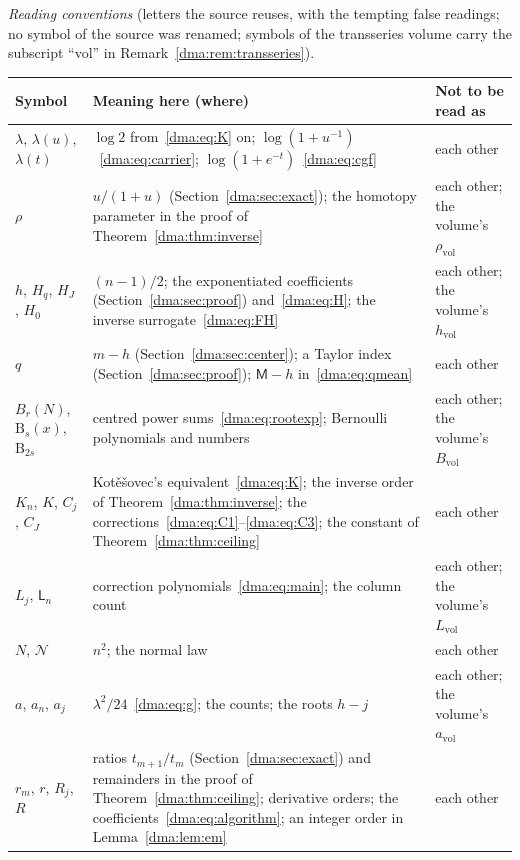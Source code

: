 \documentclass[11pt,letterpaper]{article}
\theoremstyle{remark}\newtheorem{remark}[theorem]{Remark}
\begin{document}
\medskip\noindent\begin{minipage}{\textwidth}
\emph{Reading conventions} (letters the source reuses, with the tempting
false readings; no symbol of the source was renamed; symbols of the
transseries volume carry the subscript ``vol'' in
Remark~\ref{dma:rem:transseries}).\par
\smallskip
\begingroup\small\renewcommand{\arraystretch}{1.1}
\noindent\begin{tabular}{@{}>{\raggedright\arraybackslash}p{0.95in}>{\raggedright\arraybackslash}p{3.45in}>{\raggedright\arraybackslash}p{1.75in}@{}}
\toprule
Symbol & Meaning here (where) & Not to be read as\\
\midrule
$\lambda$, $\lambda(u)$, $\lambda(t)$ & $\log2$ from~\eqref{dma:eq:K} on; $\log(1+u^{-1})$~\eqref{dma:eq:carrier}; $\log(1+e^{-t})$~\eqref{dma:eq:cgf} & each other\\
$\rho$ & $u/(1+u)$ (Section~\ref{dma:sec:exact}); the homotopy parameter in the proof of Theorem~\ref{dma:thm:inverse} & each other; the volume's $\rho_{\mathrm{vol}}$\\
$h$, $H_q$, $H_J$, $H_0$ & $(n-1)/2$; the exponentiated coefficients (Section~\ref{dma:sec:proof}) and~\eqref{dma:eq:H}; the inverse surrogate~\eqref{dma:eq:FH} & each other; the volume's $h_{\mathrm{vol}}$\\
$q$ & $m-h$ (Section~\ref{dma:sec:center}); a Taylor index (Section~\ref{dma:sec:proof}); $\mathsf M-h$ in~\eqref{dma:eq:qmean} & each other\\
$B_r(N)$, $\mathrm B_s(x)$, $\mathrm B_{2s}$ & centred power sums~\eqref{dma:eq:rootexp}; Bernoulli polynomials and numbers & each other; the volume's $B_{\mathrm{vol}}$\\
$K_n$, $K$, $C_j$, $C_J$ & Kot\v{e}\v{s}ovec's equivalent~\eqref{dma:eq:K}; the inverse order of Theorem~\ref{dma:thm:inverse}; the corrections~\eqref{dma:eq:C1}--\eqref{dma:eq:C3}; the constant of Theorem~\ref{dma:thm:ceiling} & each other\\
$L_j$, $\mathsf L_n$ & correction polynomials~\eqref{dma:eq:main}; the column count & each other; the volume's $L_{\mathrm{vol}}$\\
$N$, $\mathcal N$ & $n^2$; the normal law & each other\\
$a$, $a_n$, $a_j$ & $\lambda^2/24$~\eqref{dma:eq:g}; the counts; the roots $h-j$ & each other; the volume's $a_{\mathrm{vol}}$\\
$r_m$, $r$, $R_j$, $R$ & ratios $t_{m+1}/t_m$ (Section~\ref{dma:sec:exact}) and remainders in the proof of Theorem~\ref{dma:thm:ceiling}; derivative orders; the coefficients~\eqref{dma:eq:algorithm}; an integer order in Lemma~\ref{dma:lem:em} & each other\\

\end{tabular}
\end{minipage}
\end{document}
